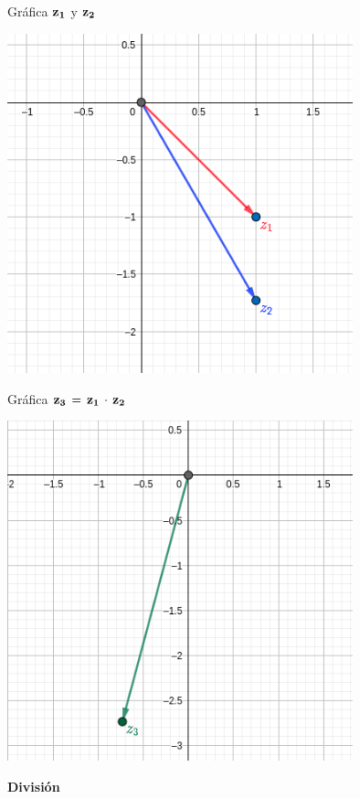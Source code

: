 \documentclass[a4paper,11pt,openany]{book}
\begin{document}
\textcolor{ao(english)}{} Gráfica $\bf{z_{1}}$ y $\bf{z_{2}}$

\begin{center}
    \includegraphics[width=10cm]{Gra-Ej-3-1.png}
\end{center}

\newpage

\textcolor{ao(english)}{} Gráfica $\bf{z_{3}\,=\,z_{1}\,\cdot\,z_{2}}$

\begin{center}
    \includegraphics[width=10cm]{Gra-Ej-3-2.png}
\end{center}




\begin{center}
\textbf{División}
\end{center}
\end{document}
